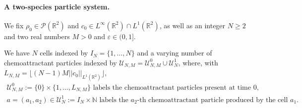 \documentclass[11pt]{article}
\newcommand{\R}{\mathbb{R}}
\newcommand{\N}{\mathbb{N}}
\newcommand{\1}{\mathbbm{1}}
\newcommand{\Pp}{\mathcal P}
\newcommand{\Uu}{\mathcal U}
\newcommand{\e}{\varepsilon}
\newcommand{\vip}{\vskip5pt}
\begin{document}
\paragraph{A two-species particle system.}
 We fix $\rho_0 \in \Pp(\R^2)$ and $c_0 \in L^\infty(\R^2)\cap L^1(\R^2)$,
as well as an integer $N\geq 2$ and two real numbers $M>0$ and $\e\in(0,1]$.

\vip
We have $N$ cells indexed by $I_N=\{1,\dots,N\}$ and a varying number of
chemoattractant particles indexed by $\Uu_{N,M}=\Uu^0_{N,M}\cup\Uu^1_N$, where, with 
$L_{N,M}=\lfloor (N-1)M||c_0||_{L^1(\R^2)}\rfloor $,
\begin{gather*}
\text{$\Uu^0_{N,M}:=\{0\}\times\{1,\dots,L_{N,M}\}$ labels the chemoattractant particles present at time $0$,}\\
\text{$a=(a_1,a_2)\in \Uu^1_{N}:=I_N\times\N$ labels
the $a_2$-th chemoattractant particle produced by the cell $a_1$.}
\end{gather*}
\end{document}
